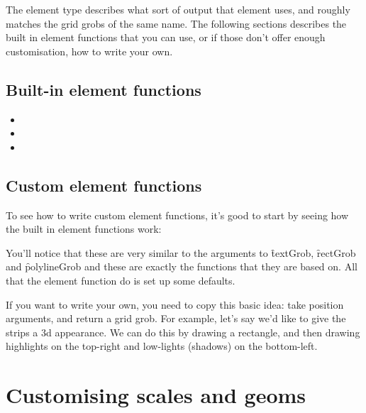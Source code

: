 The element type describes what sort of output that element uses, and roughly matches the grid grobs of the same name.  The following sections describes the built in element functions that you can use, or if those don't offer enough customisation, how to write your own.

\subsection{Built-in element functions}

\begin{itemize}
  \item {}
  \item {}
  \item {}
\end{itemize}

% 
% 

\subsection{Custom element functions}

To see how to write custom element functions, it's good to start by seeing how the built in element functions work:

% 

You'll notice that these are very similar to the arguments to \f{textGrob}, \f{rectGrob} and \f{polylineGrob} and these are exactly the functions that they are based on.  All that the element function do is set up some defaults.  

If you want to write your own, you need to copy this basic idea: take position arguments, and return a grid grob.  For example, let's say we'd like to give the strips a 3d appearance.  We can do this by drawing a rectangle, and then drawing highlights on the top-right and low-lights (shadows) on the bottom-left.






\section{Customising scales and geoms}



